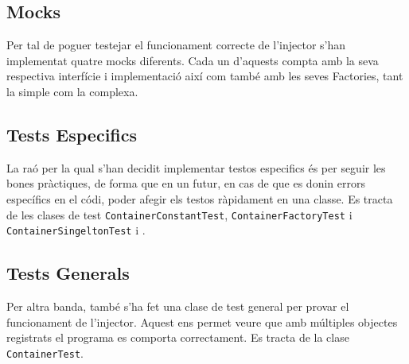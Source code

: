 
\subsection{Mocks}
Per tal de poguer testejar el funcionament correcte de l'injector s'han implementat quatre mocks diferents. Cada un d'aquests compta amb la seva respectiva interfície i implementació així com també amb les seves Factories, tant la simple com la complexa.
\subsection{Tests Especifics}
La raó per la qual s'han decidit implementar testos especifics és per seguir les bones pràctiques, de forma que en un futur, en cas de que es donin errors específics en el códi, poder afegir els testos ràpidament en una classe. Es tracta de les clases de test \texttt{ContainerConstantTest}, \texttt{ContainerFactoryTest} i \texttt{ContainerSingeltonTest} i .
\subsection{Tests Generals}
Per altra banda, també s'ha fet una clase de test general per provar el funcionament de l'injector. Aquest ens permet veure que amb múltiples objectes registrats el programa es comporta correctament. Es tracta de la clase \texttt{ContainerTest}.

